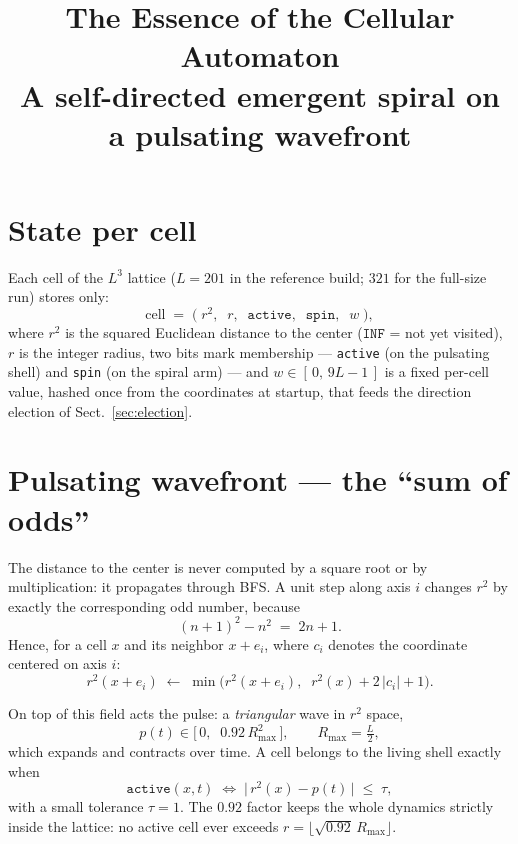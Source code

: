 \documentclass[11pt,a4paper]{article}
\title{\textbf{The Essence of the Cellular Automaton}\\[2mm]
\large A self-directed emergent spiral on a pulsating wavefront}
\author{}
\date{}
\begin{document}
\maketitle
\vspace{-8mm}

\section{State per cell}
Each cell of the $L^3$ lattice ($L = 201$ in the reference build; $321$
for the full-size run) stores only:
\[
\text{cell} \;=\; \big(\; r^2,\;\; r,\;\; \texttt{active},\;\;
\texttt{spin},\;\; w \;\big),
\]
where $r^2$ is the squared Euclidean distance to the center
($\texttt{INF}$ = not yet visited), $r$ is the integer radius, two
bits mark membership --- \texttt{active} (on the pulsating shell) and
\texttt{spin} (on the spiral arm) --- and $w \in [\,0,\,9L-1\,]$ is a
fixed per-cell value, hashed once from the coordinates at startup,
that feeds the direction election of Sect.~\ref{sec:election}.

\section{Pulsating wavefront --- the ``sum of odds''}
The distance to the center is never computed by a square root or by
multiplication: it propagates through BFS. A unit step along axis $i$
changes $r^2$ by exactly the corresponding odd number, because
\begin{equation}
(n+1)^2 - n^2 \;=\; 2n + 1 .
\end{equation}
Hence, for a cell $x$ and its neighbor $x + e_i$, where $c_i$ denotes the
coordinate centered on axis $i$:
\begin{equation}
r^2(x + e_i) \;\leftarrow\; \min\!\big(r^2(x+e_i),\;\; r^2(x) + 2\,|c_i| + 1\big).
\end{equation}

On top of this field acts the pulse: a \emph{triangular} wave in $r^2$
space,
\begin{equation}
p(t) \in \big[\,0,\;\; 0.92\,R_{\max}^2\,\big],
\qquad R_{\max} = \tfrac{L}{2},
\end{equation}
which expands and contracts over time. A cell belongs to the living shell
exactly when
\begin{equation}
\texttt{active}(x,t) \;\iff\; \big|\, r^2(x) - p(t) \,\big| \;\le\; \tau ,
\end{equation}
with a small tolerance $\tau = 1$. The $0.92$ factor keeps the whole
dynamics strictly inside the lattice: no active cell ever exceeds
$r = \lfloor\sqrt{0.92}\,R_{\max}\rfloor$.
\end{document}
